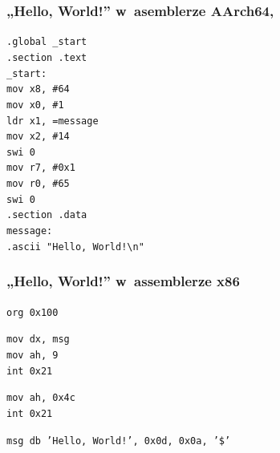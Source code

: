 \documentclass[10pt,t]{beamer}
\begin{document}
\begin{frame}
  \frametitle{„Hello, World!” w~asemblerze AArch64,
    \parencite{Low-Level-Learning-You-Can-Learn-AArch64-ETC-Ver-2020}}


  \texttt{.global \_start} \\
  \texttt{.section .text} \\



  \texttt{\_start:} \\[-0.2em]
  \hphantom{aaaaaaaa} \texttt{mov x8, \#64} \\
  \hphantom{aaaaaaaa} \texttt{mov x0, \#1} \\
  \hphantom{aaaaaaaa} \texttt{ldr x1, =message} \\
  \hphantom{aaaaaaaa} \texttt{mov x2, \#14} \\

  \hphantom{aaaaaaaa} \texttt{swi 0} \\

  \hphantom{aaaaaaaa} \texttt{mov r7, \#0x1} \\
  \hphantom{aaaaaaaa} \texttt{mov r0, \#65} \\

  \hphantom{aaaaaaaa} \texttt{swi 0} \\



  \texttt{.section .data} \\
  \texttt{message:} \\
  \hphantom{aaaaaaaa} \texttt{.ascii "Hello, World!\textbackslash n"}

\end{frame}





\begin{frame}
  \frametitle{„Hello, World!” w~assemblerze x86
    \parencite{Anonymous-Hello-World-in-x86-Assembly-Language}}


  \texttt{org 0x100} \\
  \vspace{0.8em}

  \texttt{mov dx, msg} \\
  \texttt{mov ah, 9} \\
  \texttt{int 0x21} \\
  \vspace{0.8em}

  \texttt{mov ah, 0x4c} \\
  \texttt{int 0x21} \\
  \vspace{0.8em}

  \texttt{msg db 'Hello, World!', 0x0d, 0x0a, '\$'}

\end{frame}
\end{document}
